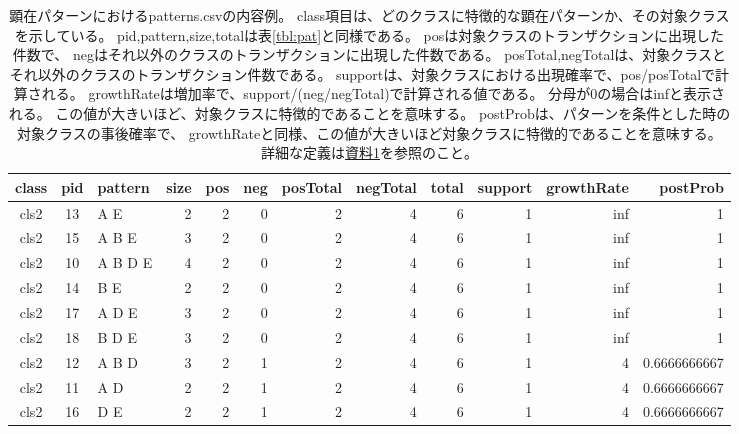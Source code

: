 \begin{table}[htbp]
\begin{center}
\caption{顕在パターンにおけるpatterns.csvの内容例\label{tbl:ep_pat}。
class項目は、どのクラスに特徴的な顕在パターンか、その対象クラスを示している。
pid,pattern,size,totalは表\ref{tbl:pat}と同様である。
posは対象クラスのトランザクションに出現した件数で、
negはそれ以外のクラスのトランザクションに出現した件数である。
posTotal,negTotalは、対象クラスとそれ以外のクラスのトランザクション件数である。
supportは、対象クラスにおける出現確率で、pos/posTotalで計算される。
growthRateは増加率で、support/(neg/negTotal)で計算される値である。
分母が0の場合はinfと表示される。
この値が大きいほど、対象クラスに特徴的であることを意味する。
postProbは、パターンを条件とした時の対象クラスの事後確率で、
growthRateと同様、この値が大きいほど対象クラスに特徴的であることを意味する。
詳細な定義は\hyperref[sect:ep]{資料1}を参照のこと。
}
{\small
\begin{tabular}{cclrrrrrrrrr}
\hline
class&pid&pattern&size&pos&neg&posTotal&negTotal&total&support&growthRate&postProb\\
\hline
 cls2&13&A E&2&2&0&2&4&6&1&inf&1\\
 cls2&15&A B E&3&2&0&2&4&6&1&inf&1\\
 cls2&10&A B D E&4&2&0&2&4&6&1&inf&1\\
 cls2&14&B E&2&2&0&2&4&6&1&inf&1\\
 cls2&17&A D E&3&2&0&2&4&6&1&inf&1\\
 cls2&18&B D E&3&2&0&2&4&6&1&inf&1\\
 cls2&12&A B D&3&2&1&2&4&6&1&4&0.6666666667\\
 cls2&11&A D&2&2&1&2&4&6&1&4&0.6666666667\\
 cls2&16&D E&2&2&1&2&4&6&1&4&0.6666666667\\
\hline
\end{tabular} 
}
\end{center}
\end{table} 


